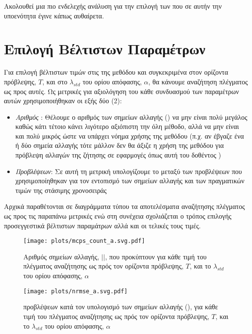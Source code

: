 \par Ακολουθεί μια πιο ενδελεχής ανάλυση για την επιλογή των  που σε αυτήν την υποενότητα έγινε κάπως αυθαίρετα.

\section{Επιλογή Βέλτιστων Παραμέτρων}

Για επιλογή βέλτιστων τιμών στις  της μεθόδου και συγκεκριμένα στον ορίζοντα πρόβλεψης, $T$, και στο $\lambda_{std}$ του ορίου απόφασης, $\alpha$, θα κάνουμε αναζήτηση πλέγματος ως προς αυτές. Ως μετρικές για αξιολόγηση του κάθε συνδυασμού των παραμέτρων αυτών χρησιμοποιήθηκαν οι εξής δύο (2):
\begin{itemize}
    \item \textit{Αριθμός }: Θέλουμε ο αριθμός των σημείων αλλαγής () να μην είναι πολύ μεγάλος καθώς κάτι τέτοιο κάνει λιγότερο αξιόπιστη την όλη μέθοδο, αλλά να μην είναι και πολύ μικρός ώστε να υπάρχει νόημα χρήσης της μεθόδου (π.χ. αν έβγαζε ένα ή δύο σημεία αλλαγής τότε μάλλον δεν θα άξιζε η  χρήση της μεθόδου για πρόβλεψη αλλαγών της ζήτησης σε εφαρμογές όπως αυτή του δοθέντος )
    \item \textit{ Προβλέψεων}: Σε αυτή τη μετρική υπολογίζουμε το  μεταξύ των προβλέψεων που χρησιμοποίηθηκαν για τον εντοπισμό των σημείων αλλαγής και των πραγματικών τιμών της στάσιμης χρονοσειράς
\end{itemize}

Αρχικά παραθέτονται σε διαγράμματα τύπου  τα αποτελέσματα αναζήτησης πλέγματος ως προς τις παραπάνω μετρικές ενώ στη συνέχεια σχολιάζεται ο τρόπος επιλογής προσεγγεστικά βέλτιστων παραμάτρων αλλά και οι τελικές τους τιμές.

\begin{figure}[H]
    \begin{center}
        \texttt{[image: plots/mcps\_count\_a.svg.pdf]}
        \caption{Αριθμός σημείων αλλαγής, $\vert$$\vert$, που προκύπτουν για κάθε τιμή του πλέγματος αναζήτησης ως πρός τον ορίζοντα πρόβλεψης, $T$, και το $\lambda_{std}$ του ορίου απόφασης, $\alpha$}
        \label{fig:mcps_count_a}
    \end{center}
\end{figure}

\begin{figure}[H]
    \begin{center}
        \texttt{[image: plots/nrmse\_a.svg.pdf]}
        \caption{ προβλέψεων κατά τον υπολογισμό των σημείων αλλαγής (), για κάθε τιμή του πλέγματος αναζήτησης ως πρός τον ορίζοντα πρόβλεψης, $T$, και το $\lambda_{std}$ του ορίου απόφασης, $\alpha$}
        \label{fig:nrmse_a}
    \end{center}
\end{figure}

